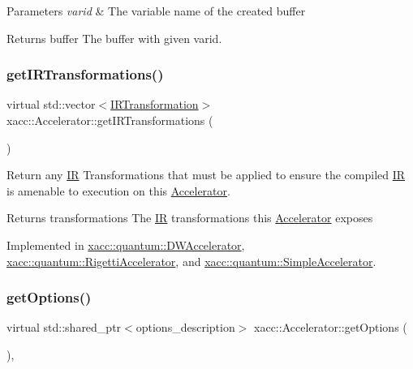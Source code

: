 \begin{DoxyParams}{Parameters}
{\em varid} & The variable name of the created buffer \\
\hline
\end{DoxyParams}
\begin{DoxyReturn}{Returns}
buffer The buffer with given varid. 
\end{DoxyReturn}
\mbox{\label{a01613_ad6e4a642dcb24e552675bcbeff1e1b04}} 
\subsubsection{\texorpdfstring{get\+I\+R\+Transformations()}{getIRTransformations()}}
{\footnotesize\ttfamily virtual std\+::vector$<$\hyperlink{a01681}{I\+R\+Transformation}$>$ xacc\+::\+Accelerator\+::get\+I\+R\+Transformations (\begin{DoxyParamCaption}{ }\end{DoxyParamCaption})\hspace{0.3cm}{\ttfamily [pure virtual]}}

Return any \hyperlink{a01677}{IR} Transformations that must be applied to ensure the compiled \hyperlink{a01677}{IR} is amenable to execution on this \hyperlink{a01613}{Accelerator}.

\begin{DoxyReturn}{Returns}
transformations The \hyperlink{a01677}{IR} transformations this \hyperlink{a01613}{Accelerator} exposes 
\end{DoxyReturn}


Implemented in \hyperlink{a01133_a89da20bd079a22d6581ea2da2293b973}{xacc\+::quantum\+::\+D\+W\+Accelerator}, \hyperlink{a01165_a443683a1dfb000603c640b2ee303cf66}{xacc\+::quantum\+::\+Rigetti\+Accelerator}, and \hyperlink{a01185_afc49c9e7973ba6c6ff9761c36198323d}{xacc\+::quantum\+::\+Simple\+Accelerator}.

\mbox{\label{a01613_a98c9eda6b54367c75667ecfbbf167979}} 
\subsubsection{\texorpdfstring{get\+Options()}{getOptions()}}
{\footnotesize\ttfamily virtual std\+::shared\+\_\+ptr$<$options\+\_\+description$>$ xacc\+::\+Accelerator\+::get\+Options (\begin{DoxyParamCaption}{ }\end{DoxyParamCaption})\hspace{0.3cm}{\ttfamily [inline]}, {\ttfamily [virtual]}}

